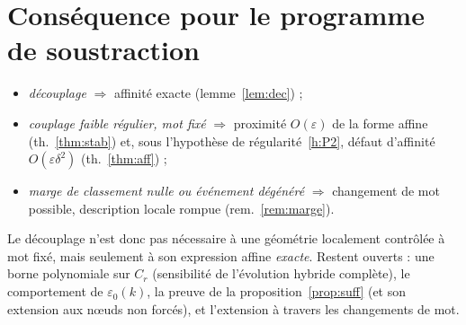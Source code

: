 \documentclass[11pt,a4paper]{article}
\theoremstyle{remark}
\theoremstyle{definition}
\newcommand{\eps}{\varepsilon}
\begin{document}
\section{Conséquence pour le programme de soustraction}

\begin{itemize}[nosep]
\item \emph{découplage} $\Rightarrow$ affinité exacte (lemme~\ref{lem:dec}) ;
\item \emph{couplage faible régulier, mot fixé} $\Rightarrow$ proximité $O(\eps)$ de la forme affine (th.~\ref{thm:stab}) et, sous l'hypothèse de régularité~\ref{h:P2}, défaut d'affinité $O(\eps\delta^2)$ (th.~\ref{thm:aff}) ;
\item \emph{marge de classement nulle ou événement dégénéré} $\Rightarrow$ changement de mot possible, description locale rompue (rem.~\ref{rem:marge}).
\end{itemize}
Le découplage n'est donc pas nécessaire à une géométrie localement contrôlée à mot fixé, mais seulement à son expression affine \emph{exacte}. Restent ouverts : une borne polynomiale sur $C_r$ (sensibilité de l'évolution hybride complète), le comportement de $\eps_0(k)$, la preuve de la proposition~\ref{prop:suff} (et son extension aux n\oe uds non forcés), et l'extension à travers les changements de mot.
\end{document}
